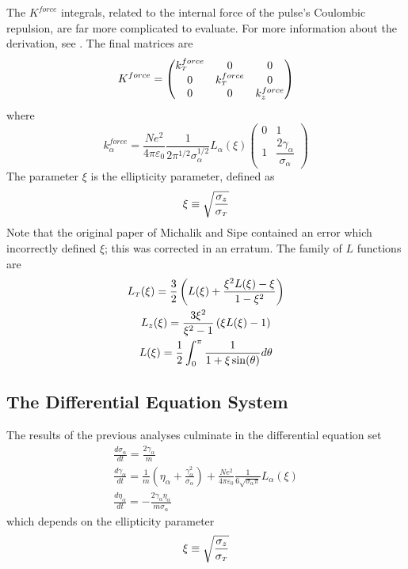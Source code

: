 The $K^{force}$ integrals, related to the internal force of the pulse's Coulombic repulsion, are far more complicated to evaluate.
For more information about the derivation, see \cite{michalik_analytic_2006}.
The final matrices are
\begin{equation}
  K^{force} = 
  \begin{pmatrix}
    k^{force}_{{\scriptscriptstyle T}} & 0 & 0 \\
    0 & k^{force}_{{\scriptscriptstyle T}} & 0 \\
    0 & 0 & k^{force}_{z}
  \end{pmatrix}
\end{equation}
where
\begin{equation}
  k^{force}_{\alpha} = 
  \frac{N e^2}{4\pi\varepsilon_0} \frac{1}{2\pi^{1/2}\sigma_{\alpha}^{1/2}} L_{\alpha}(\xi)
  \begin{pmatrix}
    0 & 1 \\
    1 & \dfrac{2 \gamma_{\alpha}}{\sigma_{\alpha}}
  \end{pmatrix}
\end{equation}
The parameter $\xi$ is the ellipticity parameter, defined as
\begin{equation}
  \xi \equiv \sqrt{\dfrac{\sigma_{z}}{\sigma_{{\scriptscriptstyle T}}}}
\end{equation}
Note that the original paper of Michalik and Sipe contained an error which incorrectly defined $\xi$; this was corrected in an erratum\cite{michalik_erratum:_2008}.
The family of $L$ functions are
\begin{gather}
  L_{{\scriptscriptstyle T}}(\xi) = \frac{3}{2} \left( L(\xi) + \frac{\xi^2 L(\xi) - \xi}{ 1 - \xi^2 } \right) \\
  L_{z}(\xi) = \frac{ 3 \xi^2 }{ \xi^2 - 1} \left( \xi L(\xi) - 1 \right) \\
  L(\xi) = \frac{1}{2} \int_0^{\pi} \frac{1}{1+\xi\sin(\theta)} d\theta
\end{gather}

\subsection{The Differential Equation System}

The results of the previous analyses culminate in the differential equation set
\begin{subequations} \label{eq:ag_original}
\begin{gather}
  \frac{d\sigma_{\alpha}}{dt} = \frac{2\gamma_{\alpha}}{m} \\
  \frac{d\gamma_{\alpha}}{dt} = \frac{1}{m} \left(\eta_{\alpha} + \frac{\gamma_{\alpha}^2}{\sigma_{\alpha}} \right) 
    + \frac{N e^2}{4\pi\varepsilon_0} \frac{1}{6 \sqrt{\sigma_{\alpha}\pi}} L_{\alpha}(\xi)\\
  \frac{d\eta_{\alpha}}{dt} = - \frac{2 \gamma_{\alpha} \eta_{\alpha}}{m \sigma_{\alpha}}
\end{gather}
\end{subequations}
which depends on the ellipticity parameter
\begin{equation}
  \xi \equiv \sqrt{\dfrac{\sigma_{z}}{\sigma_{{\scriptscriptstyle T}}}}
\end{equation}

